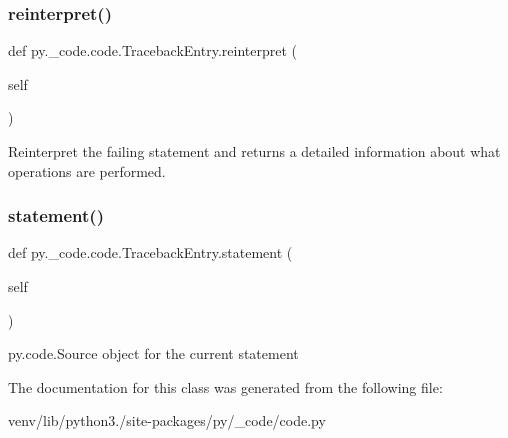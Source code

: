 \subsubsection{\texorpdfstring{reinterpret()}{reinterpret()}}
{\footnotesize\ttfamily def py.\+\_\+code.\+code.\+Traceback\+Entry.\+reinterpret (\begin{DoxyParamCaption}\item[{}]{self }\end{DoxyParamCaption})}

\begin{DoxyVerb}Reinterpret the failing statement and returns a detailed information
   about what operations are performed.\end{DoxyVerb}
 \mbox{\label{classpy_1_1__code_1_1code_1_1_traceback_entry_ab56d85c65cd337dc6112c87ad74a3f1c}} 
\subsubsection{\texorpdfstring{statement()}{statement()}}
{\footnotesize\ttfamily def py.\+\_\+code.\+code.\+Traceback\+Entry.\+statement (\begin{DoxyParamCaption}\item[{}]{self }\end{DoxyParamCaption})}

\begin{DoxyVerb}py.code.Source object for the current statement \end{DoxyVerb}
 

The documentation for this class was generated from the following file\+:\begin{DoxyCompactItemize}
\item 
venv/lib/python3./site-\/packages/py/\+\_\+code/code.\+py\end{DoxyCompactItemize}
